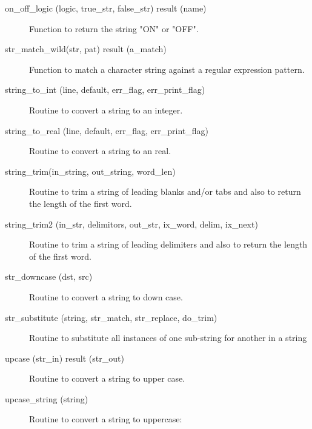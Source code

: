 \begin{description}
\label{r:on.off.logic}
\item[on_off_logic (logic, true_str, false_str) result (name)] \Newline 
Function to return the string "ON" or "OFF".

\label{r:str.match.wild}
\item[str_match_wild(str, pat) result (a_match)] \Newline 
Function to match a character string against a regular expression pattern.

\label{r:string.to.int}
\item[string_to_int (line, default, err_flag, err_print_flag)] \Newline 
Routine to convert a string to an integer.


\label{r:string.to.real}
\item[string_to_real (line, default, err_flag, err_print_flag)] \Newline 
Routine to convert a string to an real.

\label{r:string.trim}
\item[string_trim(in_string, out_string, word_len)] \Newline 
Routine to trim a string of leading blanks and/or tabs and also to return the
length of the first word.

\label{r:string.trim2}
\item[string_trim2 (in_str, delimitors, out_str, ix_word, delim, ix_next)] \Newline 
Routine to trim a string of leading delimiters and also to return the
length of the first word.

\label{r:str.downcase}
\item[str_downcase (dst, src)] \Newline 
Routine to convert a string to down case.

\label{r:str.substitute}
\item[str_substitute (string, str_match, str_replace, do_trim)] \Newline 
Routine to substitute all instances of one sub-string for another in a string

\label{r:upcase}
\item[upcase (str_in) result (str_out)] \Newline 
Routine to convert a string to upper case.

\label{r:upcase.string}
\item[upcase_string (string)] \Newline 
Routine to convert a string to uppercase:

\end{description}

